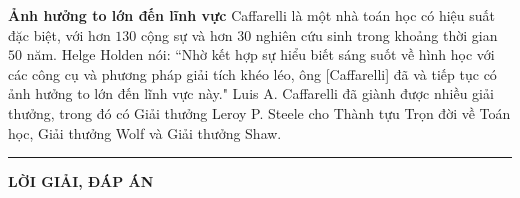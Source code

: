 \begin{multicols}{2}
	\vskip 0.1cm
	\textbf{\color{doisongtoanhoc}Ảnh hưởng to lớn đến lĩnh vực}
	\vskip 0.1cm
	Caffarelli là một nhà toán học có hiệu suất đặc biệt, với hơn $130$ cộng sự và hơn $30$ nghiên cứu sinh trong khoảng thời gian $50$ năm.
	\vskip 0.1cm
	Helge Holden nói: ``Nhờ kết hợp sự hiểu biết sáng suốt về hình học với các công cụ và phương pháp giải tích khéo léo, ông [Caffarelli] đã và tiếp tục có ảnh hưởng to lớn đến lĩnh vực này."
	\vskip 0.1cm
	Luis A. Caffarelli đã giành được nhiều giải thưởng, trong đó có Giải thưởng Leroy P. Steele cho Thành tựu Trọn đời về Toán học, Giải thưởng Wolf và Giải thưởng Shaw.
\end{multicols}
\vspace*{-10pt}
{\color{doisongtoanhoc}\rule{1\linewidth}{0.1pt}}

\vspace*{5pt}
\centerline{\Large\textbf{\color{doisongtoanhoc}LỜI GIẢI, ĐÁP ÁN}}


